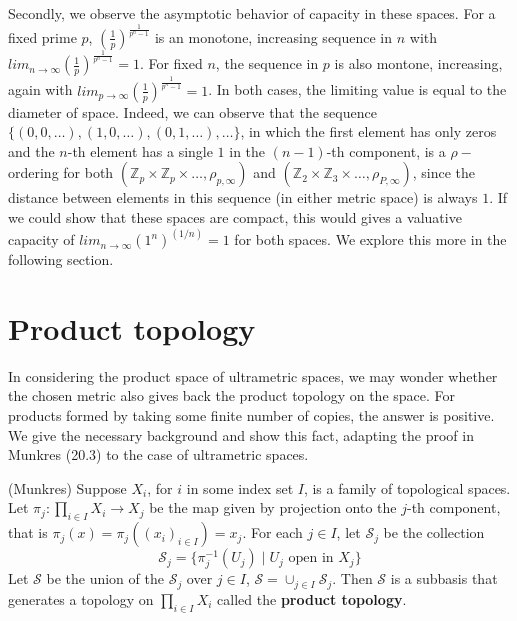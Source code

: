 Secondly, we observe the asymptotic behavior of capacity in these spaces. For a fixed prime $p$,  $(\frac{1}{p})^{\frac{1}{p^n-1}}$ is an monotone, increasing sequence in $n$ with $ lim_{n\to\infty} (\frac{1}{p})^{\frac{1}{p^n-1}} =  1$. For fixed $n$, the sequence in $p$ is also montone, increasing, again with  $ lim_{p\to\infty} (\frac{1}{p})^{\frac{1}{p^n-1}}=1$. In both cases, the limiting value is equal to the diameter of space. Indeed, we can observe that the sequence $\{(0,0,\ldots), (1,0,\ldots), (0,1,\ldots), \ldots\}$, in which the first element has only zeros and the $n$-th element has a single $1$ in the $(n-1)$-th component, is a $\rho-$ordering for both  $(\mathbb{Z}_p \times \mathbb{Z}_p \times \ldots, \rho_{p,\infty})$  and  $(\mathbb{Z}_2 \times \mathbb{Z}_3 \times \ldots, \rho_{P,\infty})$, since the distance between elements in this sequence (in either metric space) is always $1$. If we could show that these spaces are compact, this would gives a valuative capacity of $lim_{n\to\infty} (1^n)^{(1/n)} =1$ for both spaces. We explore this more in the following section.\\

\section*{Product topology}
In considering the product space of ultrametric spaces, we may wonder whether the chosen metric also gives back the product topology on the space. For products formed by taking some finite number of copies, the answer is positive. We give the necessary background and show this fact, adapting the proof in Munkres (20.3) to the case of ultrametric spaces. 

\begin{definition-proposition*} (Munkres)
Suppose $X_i$, for $i$ in some index set $I$, is a family of topological spaces.  Let $\pi_j: \prod_{i \in I} X_i \rightarrow X_j$ be the map given by projection onto the $j$-th component, that is $\pi_j (x) = \pi_j ((x_i)_{i \in I}) = x_j$. For each $j \in I$, let $\mathcal{S}_j$ be the collection \[\mathcal{S}_j = \{\pi^{-1}_j (U_j)\mid U_j \text{ open in } X_j\}\] Let $\mathcal{S}$ be the union of the $\mathcal{S}_j$ over $j \in I$, $\mathcal{S}= \cup_{j \in I} \mathcal{S}_j$. Then $\mathcal{S}$ is a subbasis that generates a topology on  $\prod_{i \in I} X_i$ called the \textbf{product topology}.\\

\end{definition-proposition*}


